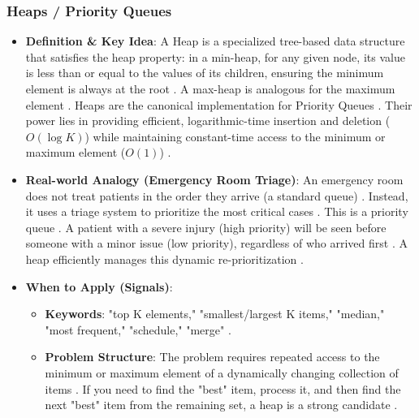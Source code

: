 \documentclass{article}
\begin{document}
\subsubsection{Heaps / Priority Queues}
\begin{itemize}
\item \textbf{Definition \& Key Idea}: A Heap is a specialized tree-based data structure that satisfies the heap property: in a min-heap, for any given node, its value is less than or equal to the values of its children, ensuring the minimum element is always at the root \cite{256}. A max-heap is analogous for the maximum element \cite{257}. Heaps are the canonical implementation for Priority Queues \cite{257}. Their power lies in providing efficient, logarithmic-time insertion and deletion ($O(\log K)$) while maintaining constant-time access to the minimum or maximum element ($O(1)$) \cite{258}.
\item \textbf{Real-world Analogy (Emergency Room Triage)}: An emergency room does not treat patients in the order they arrive (a standard queue) \cite{260}. Instead, it uses a triage system to prioritize the most critical cases \cite{261}. This is a priority queue \cite{261}. A patient with a severe injury (high priority) will be seen before someone with a minor issue (low priority), regardless of who arrived first \cite{261}. A heap efficiently manages this dynamic re-prioritization \cite{263}.
\item \textbf{When to Apply (Signals)}:
\begin{itemize}
\item \textbf{Keywords}: "top K elements," "smallest/largest K items," "median," "most frequent," "schedule," "merge" \cite{265}.
\item \textbf{Problem Structure}: The problem requires repeated access to the minimum or maximum element of a dynamically changing collection of items \cite{267}. If you need to find the "best" item, process it, and then find the next "best" item from the remaining set, a heap is a strong candidate \cite{268}.
\end{itemize}
\end{itemize}
\end{document}
